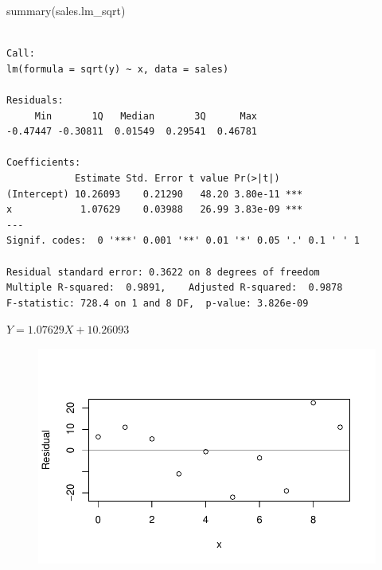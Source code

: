 \documentclass[
  letterpaper,
  DIV=11,
  numbers=noendperiod]{scrartcl}
\newenvironment{Shaded}{\begin{snugshade}}{\end{snugshade}}
\newcommand{\AttributeTok}[1]{\textcolor[rgb]{0.40,0.45,0.13}{#1}}
\newcommand{\DecValTok}[1]{\textcolor[rgb]{0.68,0.00,0.00}{#1}}
\newcommand{\FunctionTok}[1]{\textcolor[rgb]{0.28,0.35,0.67}{#1}}
\newcommand{\NormalTok}[1]{\textcolor[rgb]{0.00,0.23,0.31}{#1}}
\newcommand{\SpecialCharTok}[1]{\textcolor[rgb]{0.37,0.37,0.37}{#1}}
\newcommand{\StringTok}[1]{\textcolor[rgb]{0.13,0.47,0.30}{#1}}
\begin{document}
\begin{Shaded}
\begin{Highlighting}[]
\FunctionTok{summary}\NormalTok{(sales.lm\_sqrt)}
\end{Highlighting}
\end{Shaded}

\begin{verbatim}

Call:
lm(formula = sqrt(y) ~ x, data = sales)

Residuals:
     Min       1Q   Median       3Q      Max 
-0.47447 -0.30811  0.01549  0.29541  0.46781 

Coefficients:
            Estimate Std. Error t value Pr(>|t|)    
(Intercept) 10.26093    0.21290   48.20 3.80e-11 ***
x            1.07629    0.03988   26.99 3.83e-09 ***
---
Signif. codes:  0 '***' 0.001 '**' 0.01 '*' 0.05 '.' 0.1 ' ' 1

Residual standard error: 0.3622 on 8 degrees of freedom
Multiple R-squared:  0.9891,    Adjusted R-squared:  0.9878 
F-statistic: 728.4 on 1 and 8 DF,  p-value: 3.826e-09
\end{verbatim}

\(Y = 1.07629X + 10.26093\)

\begin{Shaded}
\end{Shaded}

\begin{figure}[H]

{\centering \includegraphics{sta9700_ch3_hw_files/figure-pdf/unnamed-chunk-29-1.pdf}

}

\end{figure}
\end{document}
